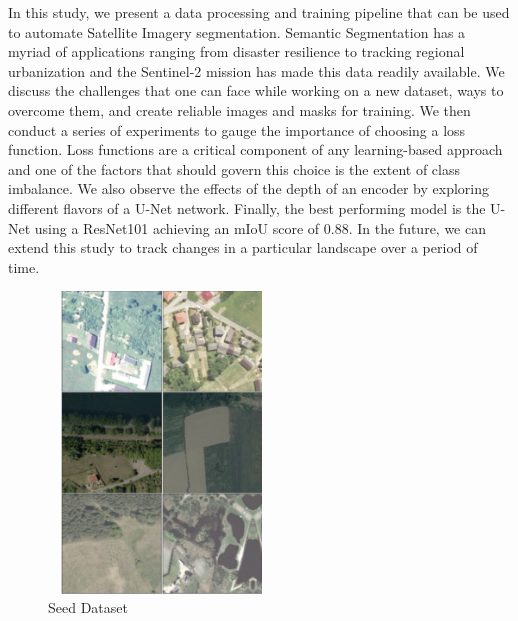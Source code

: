 \documentclass[conference]{IEEEtran}
\begin{document}
In this study, we present a data processing and training pipeline that can be used to automate Satellite Imagery segmentation. Semantic Segmentation has a myriad of applications ranging from disaster resilience to tracking regional urbanization and the Sentinel-2 mission has made this data readily available. We discuss the challenges that one can face while working on a new dataset, ways to overcome them, and create reliable images and masks for training. We then conduct a series of experiments to gauge the importance of choosing a loss function. Loss functions are a critical component of any learning-based approach and one of the factors that should govern this choice is the extent of class imbalance. We also observe the effects of the depth of an encoder by exploring different flavors of a U-Net network. Finally, the best performing model is the U-Net using a ResNet101 achieving an mIoU score of 0.88. In the future, we can extend this study to track changes in a particular landscape over a period of time.



\begin{figure}[h]
    \includegraphics[width=6cm, height=8cm]{images/dataset-vis.png}
    \caption{Seed Dataset}
\end{figure}



\newpage
\printbibliography %
\end{document}
